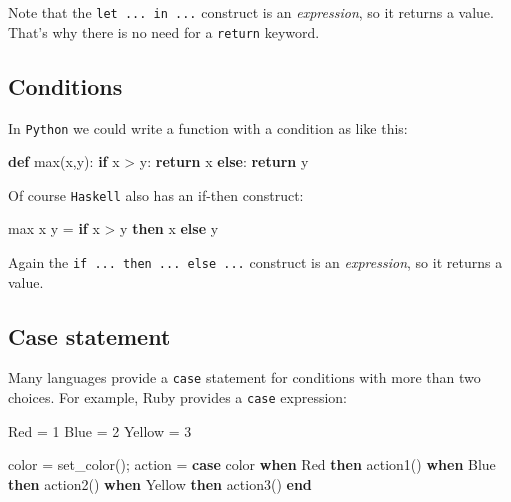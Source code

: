 \documentclass[11pt]{amsart}
\newenvironment{Shaded}{}{}
\newcommand{\KeywordTok}[1]{\textcolor[rgb]{0.00,0.44,0.13}{\textbf{{#1}}}}
\newcommand{\DataTypeTok}[1]{\textcolor[rgb]{0.56,0.13,0.00}{{#1}}}
\newcommand{\DecValTok}[1]{\textcolor[rgb]{0.25,0.63,0.44}{{#1}}}
\newcommand{\FunctionTok}[1]{\textcolor[rgb]{0.02,0.16,0.49}{{#1}}}
\newcommand{\NormalTok}[1]{{#1}}
\begin{document}
Note that the \texttt{let ... in ...} construct is an \emph{expression},
so it returns a value. That's why there is no need for a \texttt{return}
keyword.

\subsection{Conditions}\label{conditions}

In \texttt{Python} we could write a function with a condition as like
this:

\begin{Shaded}
\begin{Highlighting}[]
\KeywordTok{def} \DataTypeTok{max}\NormalTok{(x,y):}
    \KeywordTok{if} \NormalTok{x > y:}
        \KeywordTok{return} \NormalTok{x}
    \KeywordTok{else}\NormalTok{:}
        \KeywordTok{return} \NormalTok{y}
\end{Highlighting}
\end{Shaded}

Of course \texttt{Haskell} also has an if-then construct:

\begin{Shaded}
\begin{Highlighting}[]
    \NormalTok{max x y }\FunctionTok{=} 
        \KeywordTok{if} \NormalTok{x }\FunctionTok{>} \NormalTok{y}
            \KeywordTok{then} \NormalTok{x}
            \KeywordTok{else} \NormalTok{y}
\end{Highlighting}
\end{Shaded}

Again the \texttt{if ... then ... else ...} construct is an
\emph{expression}, so it returns a value.

\subsection{Case statement}\label{case-statement}

Many languages provide a \texttt{case} statement for conditions with
more than two choices. For example, Ruby provides a \texttt{case}
expression:

\begin{Shaded}
\begin{Highlighting}[]
    \DataTypeTok{Red} \NormalTok{= }\DecValTok{1}
    \DataTypeTok{Blue} \NormalTok{= }\DecValTok{2}
    \DataTypeTok{Yellow} \NormalTok{= }\DecValTok{3}

    \NormalTok{color = set_color();}
    \NormalTok{action = }\KeywordTok{case} \NormalTok{color }
        \KeywordTok{when} \DataTypeTok{Red} \KeywordTok{then} \NormalTok{action1()}
        \KeywordTok{when} \DataTypeTok{Blue} \KeywordTok{then} \NormalTok{action2()}
        \KeywordTok{when} \DataTypeTok{Yellow} \KeywordTok{then} \NormalTok{action3()}
    \KeywordTok{end}
\end{Highlighting}
\end{Shaded}
\end{document}
